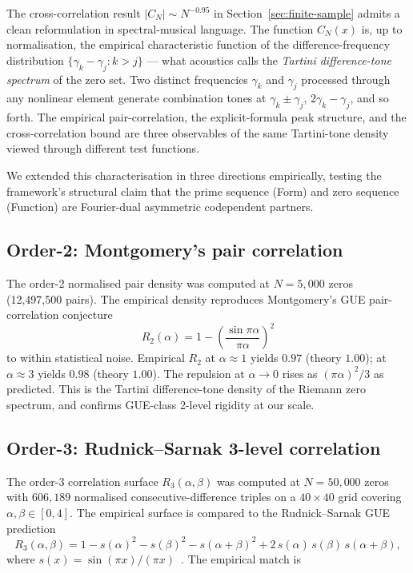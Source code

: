 \documentclass[11pt,a4paper]{article}
\theoremstyle{plain}
\theoremstyle{definition}
\theoremstyle{remark}
\begin{document}
The cross-correlation result $|C_N| \sim N^{-0.95}$ in
Section~\ref{sec:finite-sample} admits a clean reformulation in
spectral-musical language. The function $C_N(x)$ is, up to
normalisation, the empirical characteristic function of the
difference-frequency distribution $\{\gamma_k - \gamma_j : k > j\}$
--- what acoustics calls the \emph{Tartini difference-tone spectrum}
of the zero set. Two distinct frequencies $\gamma_k$ and $\gamma_j$
processed through any nonlinear element generate combination tones
at $\gamma_k \pm \gamma_j$, $2\gamma_k - \gamma_j$, and so forth.
The empirical pair-correlation, the explicit-formula peak structure,
and the cross-correlation bound are three observables of the same
Tartini-tone density viewed through different test functions.

We extended this characterisation in three directions empirically,
testing the framework's structural claim that the prime sequence
(Form) and zero sequence (Function) are Fourier-dual asymmetric
codependent partners.

\subsection{Order-2: Montgomery's pair correlation}
\label{sec:tartini-r2}

The order-2 normalised pair density was computed at $N = 5{,}000$
zeros (12{,}497{,}500 pairs). The empirical density reproduces
Montgomery's GUE pair-correlation conjecture
\begin{equation}
  R_2(\alpha) = 1 - \left(\frac{\sin \pi\alpha}{\pi\alpha}\right)^2
  \label{eq:R2}
\end{equation}
to within statistical noise. Empirical $R_2$ at $\alpha \approx 1$
yields $0.97$ (theory $1.00$); at $\alpha \approx 3$ yields $0.98$
(theory $1.00$). The repulsion at $\alpha \to 0$ rises as $(\pi\alpha)^2/3$
as predicted. This is the Tartini difference-tone density of the
Riemann zero spectrum, and confirms GUE-class 2-level rigidity at
our scale.

\subsection{Order-3: Rudnick--Sarnak 3-level correlation}
\label{sec:tartini-r3}

The order-3 correlation surface $R_3(\alpha, \beta)$ was computed
at $N = 50{,}000$ zeros with $606{,}189$ normalised consecutive-difference
triples on a $40 \times 40$ grid covering $\alpha, \beta \in [0, 4]$.
The empirical surface is compared to the Rudnick--Sarnak GUE prediction
\begin{equation}
  R_3(\alpha, \beta) = 1 - s(\alpha)^2 - s(\beta)^2 - s(\alpha+\beta)^2
  + 2\,s(\alpha)\,s(\beta)\,s(\alpha+\beta),
  \label{eq:R3}
\end{equation}
where $s(x) = \sin(\pi x)/(\pi x)$~\cite{RudnickSarnak1996}.
The empirical match is
\end{document}
